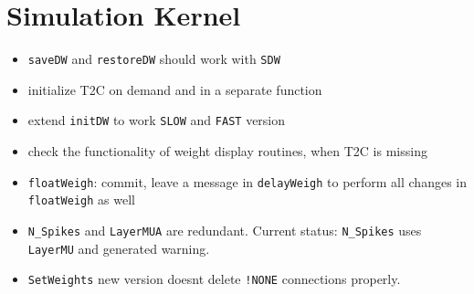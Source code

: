 \documentclass[12pt]{article}
\begin{document}
\section{Simulation Kernel}
\begin{itemize}
\item \texttt{saveDW} and \texttt{restoreDW} should work with \texttt{SDW}
\item initialize T2C on demand and in a separate function
\item extend \texttt{initDW} to work \texttt{SLOW} and \texttt{FAST} version
\item check the functionality of weight display routines, when T2C is missing
\item \texttt{floatWeigh}: commit, leave a message in \texttt{delayWeigh} to perform all changes in \texttt{floatWeigh} as well
\item \texttt{N_Spikes} and \texttt{LayerMUA} are redundant. Current status: \texttt{N_Spikes} uses \texttt{LayerMU} and generated warning.
\item \texttt{SetWeights} new version doesnt delete \texttt{!NONE} connections properly.
\end{itemize}
\end{document}
